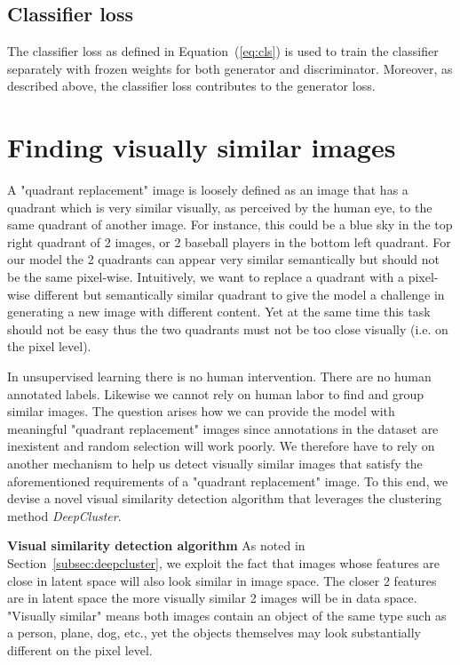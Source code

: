 \documentclass[a4paper,12pt]{report}
\begin{document}
\subsection{Classifier loss}
The classifier loss as defined in Equation~(\ref{eq:cls}) is used to train the classifier separately with frozen weights for both generator and discriminator. Moreover, as described above, the classifier loss contributes to the generator loss.



\section{Finding visually similar images} \label{subsec:img_clustering}
A "quadrant replacement" image is loosely defined as an image that has a quadrant which is very similar visually, as perceived by the human eye, to the same quadrant of another image. For instance, this could be a blue sky in the top right quadrant of 2 images, or 2 baseball players in the bottom left quadrant. For our model the 2 quadrants can appear very similar semantically but should not be the same pixel-wise. Intuitively, we want to replace a quadrant with a pixel-wise different but semantically similar quadrant to give the model a challenge in generating a new image with different content. Yet at the same time this task should not be easy thus the two quadrants must not be too close visually (i.e. on the pixel level).

In unsupervised learning there is no human intervention. There are no human annotated labels. Likewise we cannot rely on human labor to find and group similar images. The question arises how we can provide the model with meaningful "quadrant replacement" images since annotations in the dataset are inexistent and random selection will work poorly. We therefore have to rely on another mechanism to help us detect visually similar images that satisfy the aforementioned requirements of a "quadrant replacement" image. To this end, we devise a novel visual similarity detection algorithm that leverages the clustering method \textit{DeepCluster}.

\textbf{Visual similarity detection algorithm} As noted in Section~\ref{subsec:deepcluster}, we exploit the fact that images whose features are close in latent space will also look similar in image space. The closer 2 features are in latent space the more visually similar 2 images will be in data space. "Visually similar" means both images contain an object of the same type such as a person, plane, dog, etc., yet the objects themselves may look substantially different on the pixel level.
\end{document}

